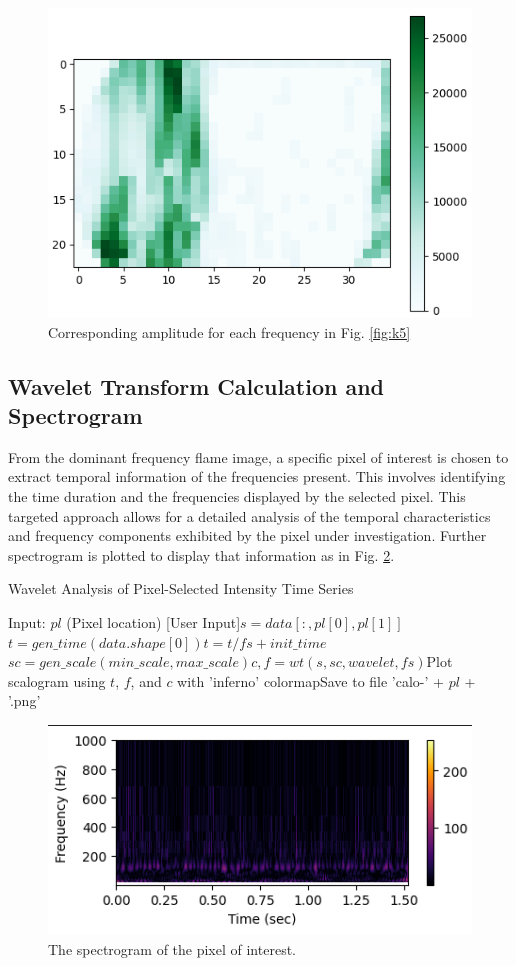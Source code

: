 \documentclass[conference]{IEEEtran}
\begin{document}
		\begin{figure}[H]
	\includegraphics[scale=.51]{plot/ampli.png}
	\caption{Corresponding amplitude for each frequency in Fig. \ref{fig:k5}}\label{fig:k6}
\end{figure}

\subsection{Wavelet Transform Calculation and Spectrogram}

From the dominant frequency flame image, a specific pixel of interest is chosen to extract temporal information of the frequencies present. This involves identifying the time duration and the frequencies displayed by the selected pixel. This targeted approach allows for a detailed analysis of the temporal characteristics and frequency components exhibited by the pixel under investigation. Further spectrogram is plotted to display that information as in Fig. \ref{fig:k7}.

\begin{algorithm}
	\caption{Wavelet Analysis of Pixel-Selected Intensity Time Series}
	\begin{algorithmic}[1]
		\State Input: $pl$ (Pixel location) [User Input]\State $s = data[:, pl[0], pl[1]]$\State $t = gen\_time(data.shape[0])$\State $t = t/fs + init\_time$\State $sc = gen\_scale(min\_scale, max\_scale)$\State $c, f = wt(s, sc, wavelet, fs)$\State Plot scalogram using $t$, $f$, and $c$ with 'inferno' colormap\State Save to file 'calo-' + $pl$ + '.png'
\end{algorithmic}
\end{algorithm}

		\begin{figure}[H]
	\includegraphics[scale=.51]{plot/spect.png}
	\caption{The spectrogram of the pixel of interest.}\label{fig:k7}
\end{figure}
\end{document}
